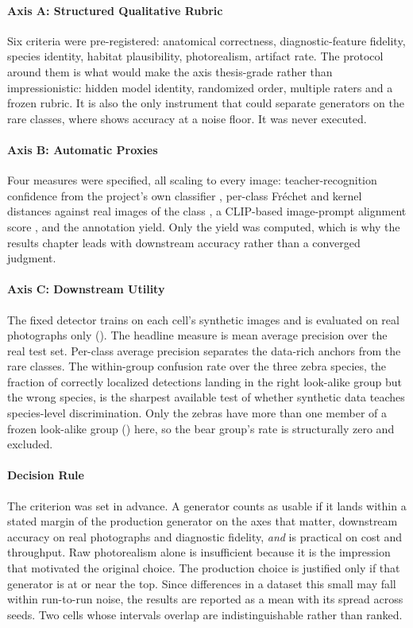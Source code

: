 \paragraph{Axis A: Structured Qualitative Rubric}
Six criteria were pre-registered: anatomical correctness, diagnostic-feature fidelity, species identity, habitat plausibility, photorealism, artifact rate. The protocol around them is what would make the axis thesis-grade rather than impressionistic: hidden model identity, randomized order, multiple raters and a frozen rubric. It is also the only instrument that could separate generators on the rare classes, where  shows accuracy at a noise floor. It was never executed.

\paragraph{Axis B: Automatic Proxies}
Four measures were specified, all scaling to every image: teacher-recognition confidence from the project's own classifier \cite{gadotCropNotCrop2024a}, per-class Fréchet and kernel distances against real images of the class \cite{heuselGANsTrainedTwo2018,binkowskiDemystifyingMMDGANs2021}, a CLIP-based image-prompt alignment score \cite{hesselCLIPScoreReferencefreeEvaluation2021}, and the annotation yield. Only the yield was computed, which is why the results chapter leads with downstream accuracy rather than a converged judgment.

\paragraph{Axis C: Downstream Utility}
The fixed detector trains on each cell's synthetic images and is evaluated on real photographs only (). The headline measure is mean average precision over the real test set. Per-class average precision separates the data-rich anchors from the rare classes. The within-group confusion rate over the three zebra species, the fraction of correctly localized detections landing in the right look-alike group but the wrong species, is the sharpest available test of whether synthetic data teaches species-level discrimination. Only the zebras have more than one member of a frozen look-alike group () here, so the bear group's rate is structurally zero and excluded.

\paragraph{Decision Rule}
The criterion was set in advance. A generator counts as usable if it lands within a stated margin of the production generator on the axes that matter, downstream accuracy on real photographs and diagnostic fidelity, \emph{and} is practical on cost and throughput. Raw photorealism alone is insufficient because it is the impression that motivated the original choice. The production choice is justified only if that generator is at or near the top. Since differences in a dataset this small may fall within run-to-run noise, the results are reported as a mean with its spread across seeds. Two cells whose intervals overlap are indistinguishable rather than ranked.
